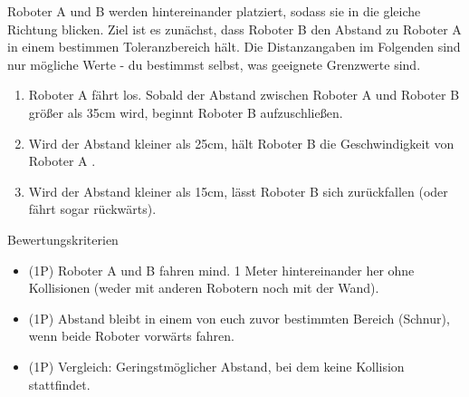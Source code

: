 \documentclass[
	12pt,
	article,
	type=bsc, %
	colorbacktitle,
	instlogo,
	accentcolor=tud1c,
	german,
	twoside
]{tudexercise}
\begin{document}
	Roboter A und B werden hintereinander platziert, sodass sie in die gleiche Richtung blicken. Ziel ist es zunächst, dass Roboter B den Abstand zu Roboter A in einem bestimmen Toleranzbereich hält. Die Distanzangaben im Folgenden sind nur mögliche Werte - du bestimmst selbst, was geeignete Grenzwerte sind.
	\begin{enumerate}
	\item Roboter A fährt los. Sobald der Abstand zwischen Roboter A und Roboter B größer als 35cm wird, beginnt Roboter B aufzuschließen.
	\item Wird der Abstand kleiner als 25cm, hält Roboter B die Geschwindigkeit von Roboter A .
	\item Wird der Abstand kleiner als 15cm, lässt Roboter B sich zurückfallen (oder fährt sogar rückwärts).
	\end{enumerate}
	Bewertungskriterien
	\begin{itemize}
	\item (1P) Roboter A und B fahren mind. 1 Meter hintereinander her ohne Kollisionen (weder mit anderen Robotern noch mit der Wand).
	\item (1P) Abstand bleibt in einem von euch zuvor bestimmten Bereich (Schnur), wenn beide Roboter vorwärts fahren.
	\item (1P) Vergleich: Geringstmöglicher Abstand, bei dem keine Kollision stattfindet.
	\end{itemize}
	
	\newpage
\end{document}
